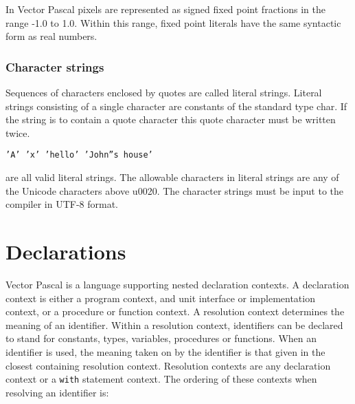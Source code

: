 In Vector Pascal pixels are represented as signed fixed point
fractions in the range -1.0 to 1.0. Within this range, fixed point literals
have the same syntactic form as real numbers.


\subsection{Character strings}

Sequences of characters enclosed by quotes are called literal
strings. Literal strings consisting of a single character are
constants of the standard type char. If the string is to contain a quote character
this quote character must be written twice.

\texttt{\small 'A' 'x' 'hello' 'John''s house'}{\small \par}

are all valid literal strings. The allowable characters in literal strings are
any of the Unicode characters above u0020. The character strings must be input
to the compiler in UTF-8 format.




\chapter{Declarations}

Vector Pascal is a language supporting nested declaration
contexts. A declaration context is either a program context, and unit interface
or implementation context, or a procedure or function context. A resolution
context determines the meaning of an identifier. Within a resolution context,
identifiers can be declared to stand for constants, types, variables, procedures
or functions. When an identifier is used, the meaning taken on by the identifier
is that given in the closest containing resolution context. Resolution contexts
are any declaration context or a \texttt{with} statement context. The ordering
of these contexts when resolving an identifier is:

